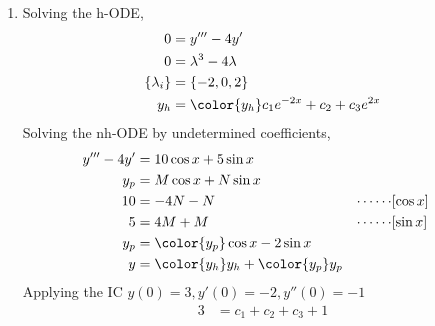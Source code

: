 \begin{enumerate}
\begin{figure}[H]
          \end{figure}

    \item Solving the h-ODE,
          \begin{align}
              0               & = y''' - 4y'                                 \\
              0               & = \lambda^{3} - 4\lambda                     \\
              \{\lambda_{i}\} & = \{-2, 0, 2\}                               \\
              y_{h}           & = \color{y_h} c_1 e^{-2x} + c_2 + c_3 e^{2x}
          \end{align}
          Solving the nh-ODE by undetermined coefficients,
          \begin{align}
              y''' - 4y' & = 10\cos x + 5\sin x                                                  \\
              y_{p}      & = M\cos x + N\sin x                                                   \\
              10         & = -4N - N                                   & \cdots\cdots & [\cos x] \\
              5          & = 4M + M                                    & \cdots\cdots & [\sin x] \\
              y_{p}      & = \color{y_p} \cos x - 2\sin x                                        \\
              y          & = {\color{y_h} y_{h}} + {\color{y_p} y_{p}}
          \end{align}
          Applying the IC $ y(0) = 3, y'(0) = -2, y''(0) = -1 $
          \begin{align}
              3  & = c_1 + c_2 + c_3 + 1                               \\

\end{align}
\end{enumerate}
